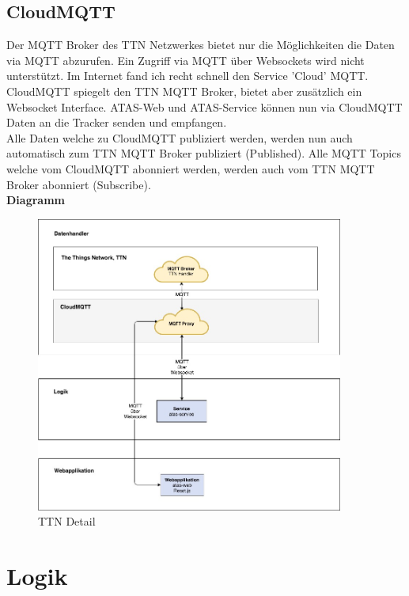 \documentclass[11pt,english,german]{report}
\theoremstyle{definition}
\begin{document}
\subsection{CloudMQTT}
Der MQTT Broker des TTN Netzwerkes bietet nur die Möglichkeiten die Daten via MQTT abzurufen. Ein Zugriff via MQTT über Websockets wird nicht unterstützt. Im Internet fand ich recht schnell den Service 'Cloud' MQTT.   CloudMQTT spiegelt den TTN MQTT Broker, bietet aber zusätzlich ein Websocket Interface. ATAS-Web und ATAS-Service können nun via CloudMQTT Daten an die Tracker senden und empfangen.\\[0.3cm]
Alle Daten welche zu CloudMQTT publiziert werden, werden nun auch automatisch zum TTN MQTT Broker publiziert (Published). Alle MQTT Topics welche vom CloudMQTT abonniert werden, werden auch vom TTN MQTT Broker abonniert (Subscribe).  \\[0.3cm]
\textbf{Diagramm}
\begin{figure}[H]
	\centering
	\includegraphics[width=0.9\textwidth]{img/system/ATAS_SystemOverview_CloudMQTT_BA.jpg}
	\caption[TTN Detail]
	{TTN Detail}
\end{figure}

\newpage
\section{Logik}
\end{document}
